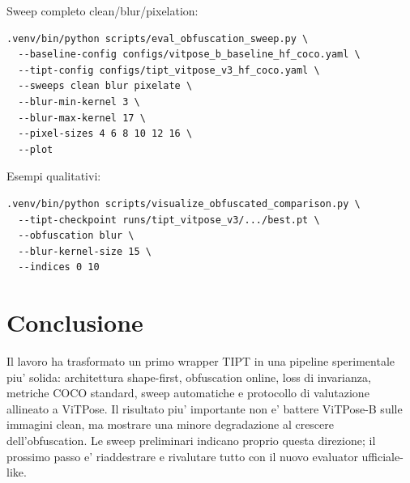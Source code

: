 \documentclass[11pt,a4paper]{article}
\newcommand{\vitpose}{ViTPose-B}
\begin{document}
Sweep completo clean/blur/pixelation:

\begin{verbatim}
.venv/bin/python scripts/eval_obfuscation_sweep.py \
  --baseline-config configs/vitpose_b_baseline_hf_coco.yaml \
  --tipt-config configs/tipt_vitpose_v3_hf_coco.yaml \
  --sweeps clean blur pixelate \
  --blur-min-kernel 3 \
  --blur-max-kernel 17 \
  --pixel-sizes 4 6 8 10 12 16 \
  --plot
\end{verbatim}

Esempi qualitativi:

\begin{verbatim}
.venv/bin/python scripts/visualize_obfuscated_comparison.py \
  --tipt-checkpoint runs/tipt_vitpose_v3/.../best.pt \
  --obfuscation blur \
  --blur-kernel-size 15 \
  --indices 0 10
\end{verbatim}

\section{Conclusione}

Il lavoro ha trasformato un primo wrapper TIPT in una pipeline sperimentale piu'
solida: architettura shape-first, obfuscation online, loss di invarianza,
metriche COCO standard, sweep automatiche e protocollo di valutazione allineato
a ViTPose. Il risultato piu' importante non e' battere \vitpose{} sulle immagini
clean, ma mostrare una minore degradazione al crescere dell'obfuscation. Le
sweep preliminari indicano proprio questa direzione; il prossimo passo e'
riaddestrare e rivalutare tutto con il nuovo evaluator ufficiale-like.
\end{document}
